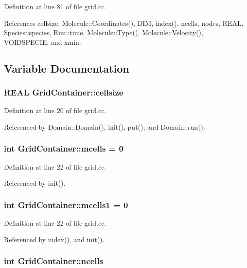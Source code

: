 Definition at line 81 of file grid.cc.

References cellsize, Molecule::Coordinates(), DIM, index(), ncells, nodes, REAL, Species::species, Run::time, Molecule::Type(), Molecule::Velocity(), VOIDSPECIE, and xmin.

\subsection{Variable Documentation}
\hypertarget{namespaceGridContainer_bf30127e3b23c77aadb1ef337353b272}{
\subsubsection[{cellsize}]{\setlength{\rightskip}{0pt plus 5cm}REAL {\bf GridContainer::cellsize}}}
\label{namespaceGridContainer_bf30127e3b23c77aadb1ef337353b272}




Definition at line 20 of file grid.cc.

Referenced by Domain::Domain(), init(), put(), and Domain::run().\hypertarget{namespaceGridContainer_90ecd8535be045b1958c270c13d67846}{
\subsubsection[{mcells}]{\setlength{\rightskip}{0pt plus 5cm}int {\bf GridContainer::mcells} = 0}}
\label{namespaceGridContainer_90ecd8535be045b1958c270c13d67846}




Definition at line 22 of file grid.cc.

Referenced by init().\hypertarget{namespaceGridContainer_a4e7210a39b907a414c0d77b750e291f}{
\subsubsection[{mcells1}]{\setlength{\rightskip}{0pt plus 5cm}int {\bf GridContainer::mcells1} = 0}}
\label{namespaceGridContainer_a4e7210a39b907a414c0d77b750e291f}




Definition at line 22 of file grid.cc.

Referenced by index(), and init().\hypertarget{namespaceGridContainer_c25718f4bfb7b8b8768a5c49233685a0}{
\subsubsection[{ncells}]{\setlength{\rightskip}{0pt plus 5cm}int {\bf GridContainer::ncells}}}
\label{namespaceGridContainer_c25718f4bfb7b8b8768a5c49233685a0}




